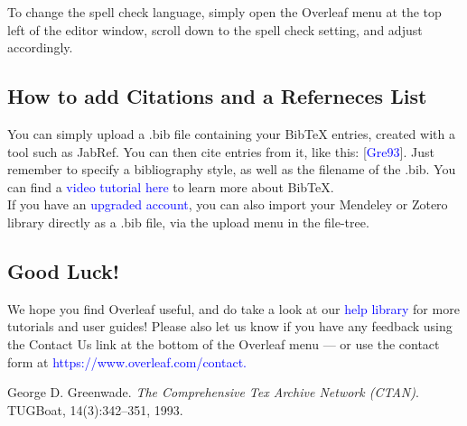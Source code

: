 \documentclass{article}
\begin{document}
\space{} To change the spell check language, simply open the Overleaf menu at the top left of the editor
window, scroll down to the spell check setting, and adjust accordingly.\\
\subsection{How to add Citations and a Referneces List}
You can simply upload a .bib file containing your BibTeX entries, created with a tool such as JabRef.
You can then cite entries from it, like this: [\textcolor{blue}{Gre93}]. Just remember to specify a bibliography style, as
well as the filename of the .bib. You can find a \textcolor{blue}{video tutorial here} to learn more about BibTeX.\\

If you have an \textcolor{blue}{upgraded account}, you can also import your Mendeley or Zotero library directly as
a .bib file, via the upload menu in the file-tree.
\subsection{Good Luck!}
We hope you find Overleaf useful, and do take a look at our \textcolor{blue}{help library} for more tutorials and user
guides! Please also let us know if you have any feedback using the Contact Us link at the bottom of
the Overleaf menu — or use the contact form at \textcolor{blue}{https://www.overleaf.com/contact.}


\begin{thebibliography}{9}
	George D. Greenwade. 
	\textit{The Comprehensive Tex Archive Network (CTAN)}. 
	TUGBoat, 14(3):342--351, 1993.
\end{thebibliography}
	
\end{document}
